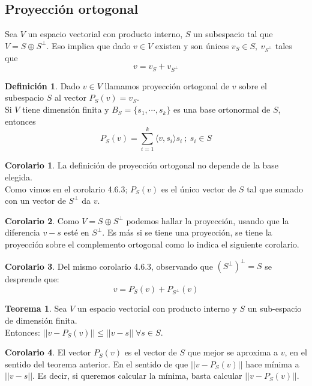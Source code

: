 \documentclass[10pt]{article}
\theoremstyle{definition}
\newtheorem{definition}{Definición}[section]
\newtheorem{theorem}{Teorema}[section]
\newtheorem{corollary}{Corolario}[theorem]
\begin{document}
\subsection{Proyección ortogonal}
Sea $V$ un espacio vectorial con producto interno, $S$ un subespacio tal que $V=S\oplus S^\bot$. Eso implica que dado $v\in V$ existen y son únicos $v_S\in S,\ v_{S^\bot}$ tales que $$v=v_S+v_{S^\bot}$$
\begin{definition}
	Dado $v\in V$ llamamos proyección ortogonal de $v$ sobre el subespacio $S$ al vector $P_S(v)=v_S$.
	\\Si $V$ tiene dimensión finita y $B_S=\{s_1,\cdots,s_k\}$ es una base ortonormal de $S$, entonces $$P_S(v)=\sum_{i=1}^{k} \langle v,s_i\rangle s_i\ ;\ s_i\in S$$
\end{definition}
\begin{corollary}
	La definición de proyección ortogonal no depende de la base elegida.\\
	Como vimos en el corolario 4.6.3; $P_S(v)$ es el único vector de $S$ tal que sumado con un vector de $S^\bot$ da $v$.
\end{corollary}
\begin{corollary}
	Como $V=S\oplus S^\bot$ podemos hallar la proyección, usando que la diferencia $v-s$ esté en $S^\bot$. Es más si se tiene una proyección, se tiene la proyección sobre el complemento ortogonal como lo indica el siguiente corolario.
\end{corollary}
\begin{corollary}
	Del mismo corolario 4.6.3, observando que $(S^\bot)^\bot=S$ se desprende que: $$v=P_S(v)+P_{S^\bot}(v)$$
\end{corollary}
\begin{theorem}
	Sea $V$ un espacio vectorial con producto interno y $S$ un sub-espacio de dimensión finita.\\
	Entonces: $||v-P_S(v)||\le ||v-s||\ \forall s\in S$.
\end{theorem}
\begin{corollary}
	El vector $P_S(v)$ es el vector de $S$ que mejor se aproxima a $v$, en el sentido del teorema anterior. En el sentido de que $||v-P_S(v)||$ hace mínima a $||v-s||$. Es decir, si queremos calcular la mínima, basta calcular $||v-P_S(v)||$.
\end{corollary}
\end{document}
